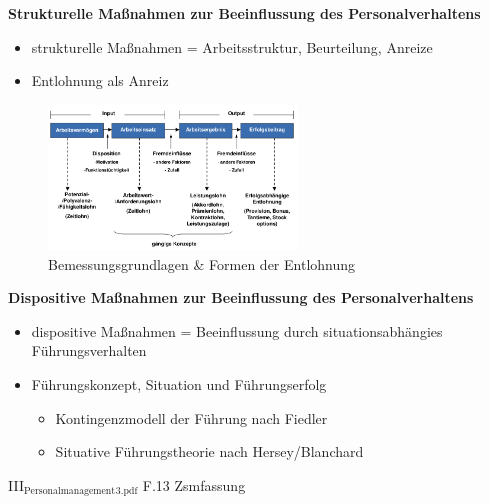 \documentclass[11pt]{article}
\begin{document}
\textbf{Strukturelle Maßnahmen zur Beeinflussung des Personalverhaltens}
\begin{itemize}
\item strukturelle Maßnahmen = Arbeitsstruktur, Beurteilung, Anreize
\item Entlohnung als Anreiz
\end{itemize}
\begin{figure}[htbp]
\centering
\includegraphics[width=250px]{./pictures/persentl.png}
\caption{Bemessungsgrundlagen \& Formen der Entlohnung}
\end{figure} 



\textbf{Dispositive Maßnahmen zur Beeinflussung des Personalverhaltens}
\begin{itemize}
\item dispositive Maßnahmen = Beeinflussung durch situationsabhängies Führungsverhalten
\item Führungskonzept, Situation und Führungserfolg
\begin{itemize}
\item Kontingenzmodell der Führung nach Fiedler
\item Situative Führungstheorie nach Hersey/Blanchard
\end{itemize}
\end{itemize}

III\(_{\text{Personalmanagement}}\)\(_{\text{3.pdf}}\) F.13 Zsmfassung
\end{document}
